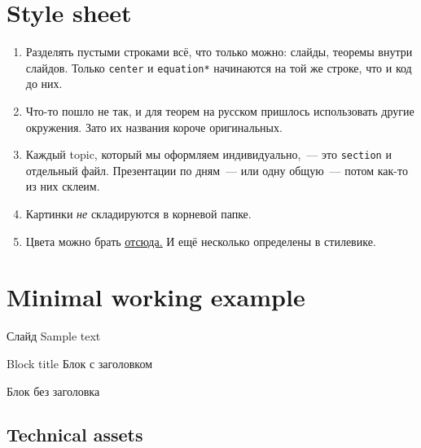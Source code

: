 \section{Style sheet}


\begin{frame}
     \begin{enumerate} \setlength{\itemsep}{2mm}
	\item Разделять пустыми строками всё, что только можно: слайды, теоремы внутри слайдов. Только {\tt center} и {\tt equation*} начинаются на той же строке, что и код до них.

	\item Что-то пошло не так, и для теорем на русском пришлось использовать другие окружения. Зато их названия короче оригинальных.

	\item Каждый topic, который мы оформляем индивидуально,~— это {\tt section} и отдельный файл. Презентации по дням~— или одну общую~— потом как-то из них склеим.

	\item Картинки {\it не} складируются в корневой папке.

	\item Цвета можно брать \underline{\href{https://www.latextemplates.com/images/svgnames.jpg}{отсюда.}} И ещё несколько определены в стилевике.
     \end{enumerate}
\end{frame}


\section{Minimal working example}


\begin{frame}{Слайд}
	Sample text

\begin{block}{Block title}
	Блок с заголовком
\end{block}

\vspace{-1.4ex} \begin{block}{\vspace*{-3ex}}
	Блок без заголовка
\end{block}
\end{frame}


\subsection{Technical assets}



